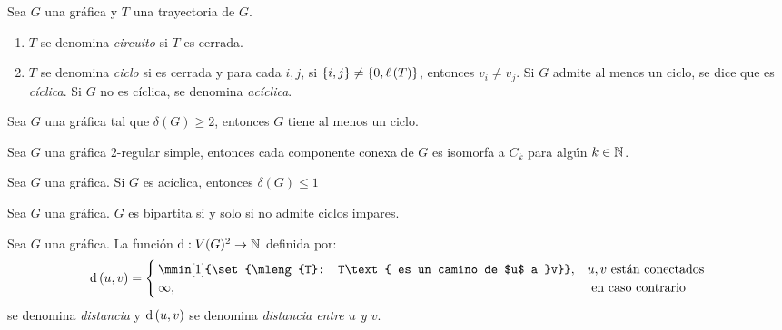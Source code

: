 \begin{definition}
	Sea $G$ una gráfica y $T$ una trayectoria de $G$.
	\begin{enumerate}
		\item $T$ se denomina \emph{circuito} si $T$ es cerrada.
		\item $T$ se denomina \emph{ciclo} si es cerrada y para cada $i, j$, si $\set{i, j}\neq\set{0, \mleng{T}}$, entonces $v_{i}\neq v_{j}$. Si $G$ admite al menos un ciclo, se dice que es \emph{cíclica}. Si $G$ no es cíclica, se denomina \emph{acíclica}.
	\end{enumerate}
\end{definition}
\begin{figure}[H]
	\centering
\end{figure}
\begin{theorem}
	Sea $G$ una gráfica tal que $\delta(G)\geq 2$, entonces $G$ tiene al menos un ciclo.
\end{theorem}
\begin{coll}
	Sea $G$ una gráfica $2$-regular simple, entonces cada componente conexa de $G$ es isomorfa a $C_{k}$ para algún $k\in\mathbb{N}^{}$.
\end{coll}
\begin{coll}
	Sea $G$ una gráfica. Si $G$ es acíclica, entonces $\delta(G)\leq 1$
\end{coll}
\begin{theorem}
	Sea $G$ una gráfica. $G$ es bipartita si y solo si no admite ciclos impares.
\end{theorem}
\begin{definition}
	Sea $G$ una gráfica. La función $\operatorname{d}:V(G)^{2}\to\mathbb{N}^{}$ definida por:
	\[ 
		\mdis{u, v} =
		\begin{cases}
			\mmin[1]{\set{\mleng{T}: T\text{ es un camino de $u$ a }v}}, & u, v\text{ están conectados}\\
			\infty, &\text{ en caso contrario} 
		\end{cases}
	\]
	se denomina \emph{distancia} y $\operatorname{d}\left( u, v \right)$ se denomina \emph{distancia entre $u$ y $v$}.
\end{definition}

